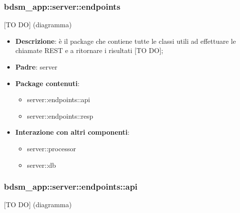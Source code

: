 


\subsubsection{bdsm\_app::server::endpoints} %
\label{ssub:bdsm_app_server_endpoints}
[TO DO] (diagramma) \newline \newline

\begin{itemize}
  \item \textbf{Descrizione}: è il package che contiene tutte le classi utili ad effettuare le chiamate REST e a ritornare i risultati [TO DO];
  \item \textbf{Padre}: server
  \item \textbf{Package contenuti}:
  	\begin{itemize}
  		\item server::endpoints::api
  		\item server::endpoints::resp
	\end{itemize}
  \item \textbf{Interazione con altri componenti}:
  	\begin{itemize}
  		\item server::processor
  		\item server::db
	\end{itemize}
\end{itemize}

\subsubsection{bdsm\_app::server::endpoints::api} %
\label{ssub:bdsm_app_server_endpoints_api}
[TO DO] (diagramma) \newline \newline

